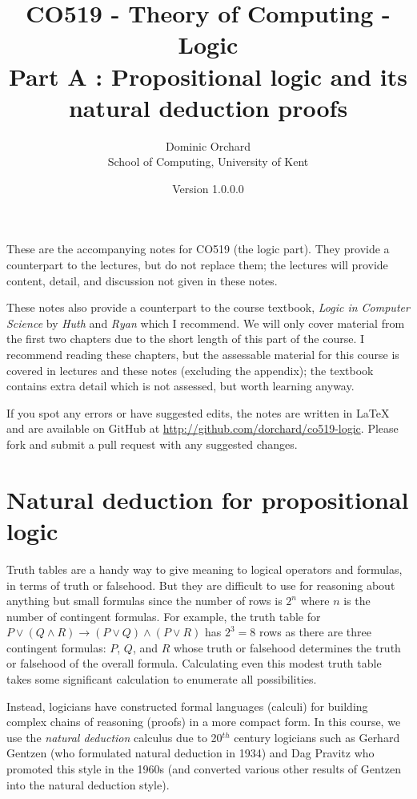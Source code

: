 \documentclass{article}
\title{\vspace{-3em}CO519 - Theory of Computing - Logic \\
  {\large{Part A : Propositional logic and its natural deduction
      proofs}}}
\author{Dominic Orchard \\
  {\small{School of Computing, University of Kent}}}
\date{Version 1.0.0.0}
\theoremstyle{definition}
\begin{document}
\maketitle

These are the accompanying notes for CO519 (the logic part). They provide
a counterpart to the lectures, but do not replace them; the lectures
will provide content, detail, and discussion not given in these notes.

These notes also provide a counterpart to the course textbook,
\emph{Logic in Computer Science} by \emph{Huth} and \emph{Ryan} which I 
recommend. We will only cover material from the first two chapters due
to the short length of this part of the course. I recommend reading
these chapters, but the assessable material for this course is
covered in lectures and these notes (excluding the appendix); the
textbook contains extra detail which is not assessed, but
worth learning anyway.

If you spot any errors or have suggested edits, the notes are written
in LaTeX and are available on GitHub at
\url{http://github.com/dorchard/co519-logic}. Please fork and submit a
pull request with any suggested changes.

\section{Natural deduction for propositional logic}

Truth tables are a handy way to give meaning to logical operators and
formulas, in terms of truth or falsehood. But they are difficult to
use for reasoning about anything but small formulas since the number
of rows is $2^n$ where $n$ is the number of contingent
formulas. For example, the truth table for
$P \vee (Q \wedge R) \rightarrow (P \vee Q) \wedge (P \vee R)$ has
$2^3 = 8$ rows as there are three contingent formulas: $P$, $Q$, and
$R$ whose truth or falsehood determines the truth or falsehood of the
overall formula. Calculating even this modest truth table takes some
significant calculation to enumerate all possibilities.

Instead, logicians have constructed formal languages (calculi) for
building complex chains of reasoning (proofs) in a more
compact form. In this course, we use the \emph{natural deduction} calculus
due to 20$^{th}$ century logicians such as Gerhard Gentzen
(who formulated natural deduction in 1934) and Dag Pravitz who 
promoted this style in the 1960s (and converted 
various other results of Gentzen into the natural deduction style).
\end{document}
